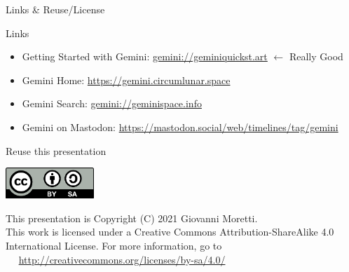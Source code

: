\documentclass[presentation, 11pt,  aspectratio=169]{beamer}
\begin{document}
\begin{frame}[label={sec:org0d0295f}]{Links \& Reuse/License}
\begin{block}{Links}
\begin{itemize}
\item \alert{Getting Started with Gemini:} \href{gemini://geminiquickst.art}{gemini://geminiquickst.art} \(\leftarrow\) \alert{Really Good}\\
\item \alert{Gemini Home:} \url{https://gemini.circumlunar.space}\\
\item \alert{Gemini Search:} \href{gemini://geminispace.info}{gemini://geminispace.info}\\
\item \alert{Gemini on Mastodon:} \url{https://mastodon.social/web/timelines/tag/gemini}\\
\end{itemize}
\end{block}

\begin{block}{Reuse this presentation}
\begin{center}
\includegraphics[width=0.25\textwidth]{images-external/cc-by-sa.png}
\end{center}

\begin{small}
This presentation is Copyright (C) 2021 Giovanni Moretti.\\

This work is licensed under a Creative Commons Attribution-ShareAlike 4.0 International License. For more information, go to\\
~~ \url{http://creativecommons.org/licenses/by-sa/4.0/}\\
\end{small}
\end{block}
\end{frame}
\end{document}
